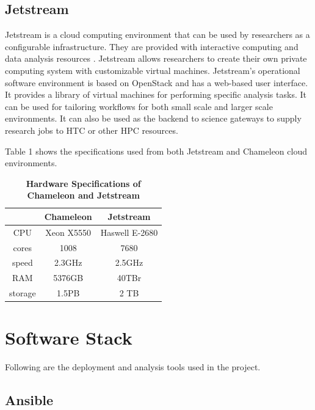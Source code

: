 \documentclass[9pt,twocolumn,twoside]{../../styles/osajnl}
\begin{document}
\subsection{Jetstream}

Jetstream is a cloud computing environment that can be used by
researchers as a configurable infrastructure. They are provided with
interactive computing and data analysis resources
\cite{jetIu}. Jetstream allows researchers to create their own private
computing system with customizable virtual machines. Jetstream’s
operational software environment is based on OpenStack and has a
web-based user interface. It provides a library of virtual machines
for performing specific analysis tasks. It can be used for tailoring
workflows for both small scale and larger scale environments. It can
also be used as the backend to science gateways to supply research
jobs to HTC or other HPC resources.

Table 1 shows the specifications used from both Jetstream and
Chameleon cloud environments.

\begin{table}[htbp]
\centering
\caption{\bf Hardware Specifications of Chameleon and Jetstream}

 \begin{tabular} {| c | c | c |}
\hline
  & Chameleon  & Jetstream \\ [0.5ex] 
 \hline

    
CPU     & Xeon X5550 & Haswell E-2680  \\
 \hline
cores &        1008   &  7680 \\
 \hline
speed     &               2.3GHz & 2.5GHz\\
 \hline
RAM   &               5376GB  &  40TBr\\
 \hline
storage     &                   1.5PB  & 2 TB\\ [1ex] 
 \hline

\end{tabular}
  \label{tab:cloud-comparison}
\end{table}

\section{Software Stack} 

Following are the deployment and analysis tools used in the project.

\subsection{Ansible}
\end{document}
